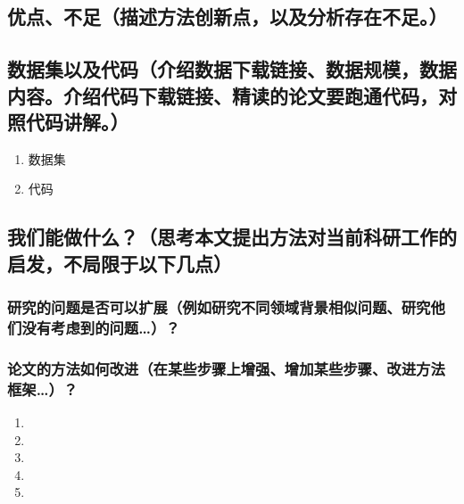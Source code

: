 \documentclass[UTF8]{article}
\begin{document}
\subsection{优点、不足（描述方法创新点，以及分析存在不足。）} 

\subsection{数据集以及代码（介绍数据下载链接、数据规模，数据内容。介绍代码下载链接、精读的论文要跑通代码，对照代码讲解。）} 
\begin{enumerate}  
	\item{数据集}
	\item{代码}
\end{enumerate} 
\subsection{我们能做什么？（思考本文提出方法对当前科研工作的启发，不局限于以下几点）} 

\subsubsection{研究的问题是否可以扩展（例如研究不同领域背景相似问题、研究他们没有考虑到的问题…）？}

\subsubsection{论文的方法如何改进（在某些步骤上增强、增加某些步骤、改进方法框架…）？}
\begin{enumerate}  
	\item
	\item
		\item
			\item	\item
			
\end{enumerate} 


\newpage
\end{document}
